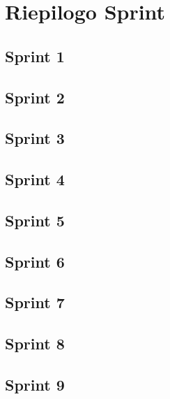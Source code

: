 \section{Riepilogo Sprint}
\subsection{Sprint 1}
    
    
\subsection{Sprint 2}
    
    
\subsection{Sprint 3}
    

\subsection{Sprint 4}
    
    
\subsection{Sprint 5}
    
    
\subsection{Sprint 6}
    

\subsection{Sprint 7}
    
    
\subsection{Sprint 8}
    
        
\subsection{Sprint 9}
    

